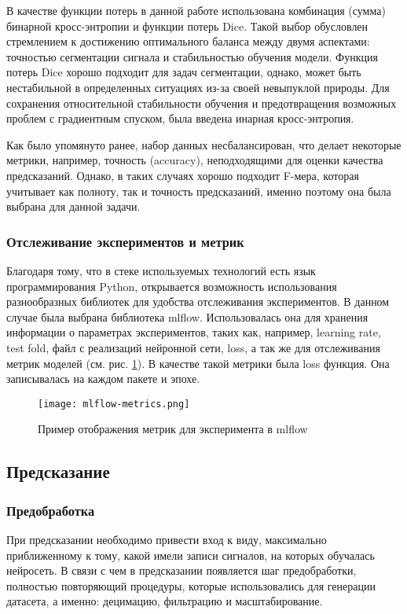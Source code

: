 В качестве функции потерь в данной работе использована комбинация (сумма) бинарной
кросс-энтропии и функции потерь Dice. Такой выбор обусловлен стремлением к
достижению оптимального баланса между двумя аспектами: точностью сегментации
сигнала и стабильностью обучения модели. Функция потерь Dice хорошо подходит
для задач сегментации, однако, может быть нестабильной в определенных ситуациях
из-за своей невыпуклой природы. Для сохранения относительной стабильности
обучения и предотвращения возможных проблем с градиентным спуском, была введена
инарная кросс-энтропия.

Как было упомянуто ранее, набор данных несбалансирован, что делает некоторые
метрики, например, точность (accuracy), неподходящими для оценки качества
предсказаний. Однако, в таких случаях хорошо подходит F-мера, которая
учитывает как полноту, так и точность предсказаний, именно поэтому она была
выбрана для данной задачи.

\subsubsection{Отслеживание экспериментов и метрик}

Благодаря тому, что в стеке используемых технологий есть язык программирования
Python, открывается возможность использования разнообразных библиотек для
удобства отслеживания экспериментов. В данном случае была выбрана библиотека
mlflow. Использовалась она для хранения информации о параметрах экспериментов,
таких как, например, learning rate, test fold, файл с реализаций нейронной
сети, loss, а так же для отслеживания метрик моделей (см. рис.
\ref{fig:mlflow-metrics}). В качестве такой метрики была loss функция. Она
записывалась на каждом пакете и эпохе.

\begin{figure}[!htb]
	\centering
	\texttt{[image: mlflow-metrics.png]}
	\caption{Пример отображения метрик для эксперимента в mlflow}
	\label{fig:mlflow-metrics}
\end{figure}

\subsection{Предсказание}
\subsubsection{Предобработка}

При предсказании необходимо привести вход к виду, максимально приближенному к
тому, какой имели записи сигналов, на которых обучалась нейросеть. В связи с
чем в предсказании появляется шаг предобработки, полностью повторяющий
процедуры, которые использовались для генерации датасета, а именно: децимацию,
фильтрацию и масштабирование.

